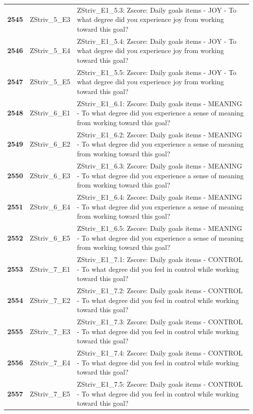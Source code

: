 \documentclass[
  letterpaper,
  DIV=11,
  numbers=noendperiod]{scrartcl}
\begin{document}
\begin{longtable}[t]{>{}cll}
\textbf{2545} & ZStriv\_5\_E3 & ZStriv\_E1\_5.3: Zscore:  Daily goals items - JOY - To what degree did you experience joy from working toward this goal?\\
\addlinespace
\textbf{2546} & ZStriv\_5\_E4 & ZStriv\_E1\_5.4: Zscore:  Daily goals items - JOY - To what degree did you experience joy from working toward this goal?\\
\textbf{2547} & ZStriv\_5\_E5 & ZStriv\_E1\_5.5: Zscore:  Daily goals items - JOY - To what degree did you experience joy from working toward this goal?\\
\textbf{2548} & ZStriv\_6\_E1 & ZStriv\_E1\_6.1: Zscore:  Daily goals items - MEANING - To what degree did you experience a sense of meaning from working toward this goal?\\
\textbf{2549} & ZStriv\_6\_E2 & ZStriv\_E1\_6.2: Zscore:  Daily goals items - MEANING - To what degree did you experience a sense of meaning from working toward this goal?\\
\textbf{2550} & ZStriv\_6\_E3 & ZStriv\_E1\_6.3: Zscore:  Daily goals items - MEANING - To what degree did you experience a sense of meaning from working toward this goal?\\
\addlinespace
\textbf{2551} & ZStriv\_6\_E4 & ZStriv\_E1\_6.4: Zscore:  Daily goals items - MEANING - To what degree did you experience a sense of meaning from working toward this goal?\\
\textbf{2552} & ZStriv\_6\_E5 & ZStriv\_E1\_6.5: Zscore:  Daily goals items - MEANING - To what degree did you experience a sense of meaning from working toward this goal?\\
\textbf{2553} & ZStriv\_7\_E1 & ZStriv\_E1\_7.1: Zscore:  Daily goals items - CONTROL - To what degree did you feel in control while working toward this goal?\\
\textbf{2554} & ZStriv\_7\_E2 & ZStriv\_E1\_7.2: Zscore:  Daily goals items - CONTROL - To what degree did you feel in control while working toward this goal?\\
\textbf{2555} & ZStriv\_7\_E3 & ZStriv\_E1\_7.3: Zscore:  Daily goals items - CONTROL - To what degree did you feel in control while working toward this goal?\\
\addlinespace
\textbf{2556} & ZStriv\_7\_E4 & ZStriv\_E1\_7.4: Zscore:  Daily goals items - CONTROL - To what degree did you feel in control while working toward this goal?\\
\textbf{2557} & ZStriv\_7\_E5 & ZStriv\_E1\_7.5: Zscore:  Daily goals items - CONTROL - To what degree did you feel in control while working toward this goal?\\

\end{longtable}
\end{document}
